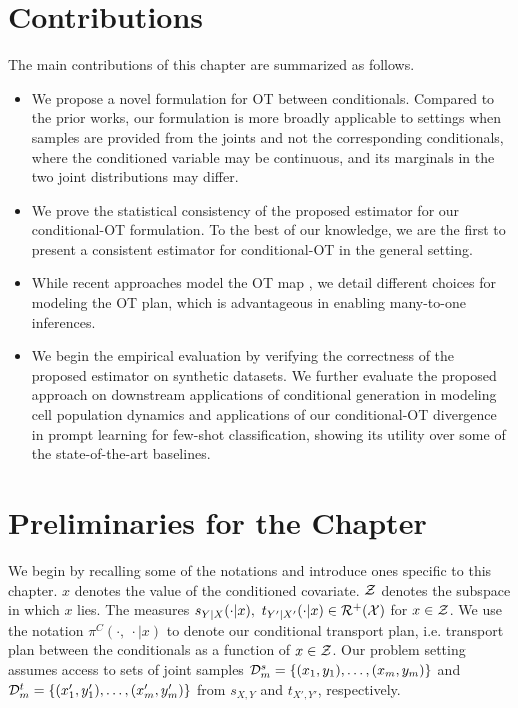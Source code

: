 \section{Contributions}
The main contributions of this chapter are summarized as follows.
\begin{itemize}
\item We propose a novel formulation for OT between conditionals. Compared to the prior works, our formulation is more broadly applicable to settings when samples are provided from the joints and not the corresponding conditionals, where the conditioned variable may be continuous, and its marginals in the two joint distributions may differ.
\item We prove the statistical consistency of the proposed estimator for our conditional-OT formulation. To the best of our knowledge, we are the first to present a consistent estimator for conditional-OT in the general setting.
\item While recent approaches model the OT map \citep{Tabak21,Cuturi22}, we detail different choices for modeling the OT plan, which is advantageous in enabling many-to-one inferences.
\item We begin the empirical evaluation by verifying the correctness of the proposed estimator on synthetic datasets. We further evaluate the proposed approach on downstream applications of conditional generation in modeling cell population dynamics and applications of our conditional-OT divergence in prompt learning for few-shot classification, showing its utility over some of the state-of-the-art baselines.
\end{itemize}

\section{Preliminaries for the Chapter}
We begin by recalling some of the notations and introduce ones specific to this chapter. $x$ denotes the value of the conditioned covariate. $\mathcal{Z}$ denotes the subspace in which $x$ lies. The measures $s_{Y|X}(\cdot|x),\ t_{Y'|X'}(\cdot|x)\in \calR^+(\calX)$ for $x\in \mathcal{Z}$. We use the notation $\pi^C(\cdot, \ \cdot|x)$ to denote our conditional transport plan, i.e. transport plan between the conditionals as a function of $x\in \mathcal{Z}$.
Our problem setting assumes access to sets of joint samples $\mathcal{D}_m^s = \{(x_1,y_1),\ldots,(x_m,y_m)\}$ and $\mathcal{D}_m^t=\{(x'_1,y'_1),\ldots,(x'_m,y'_m)\}$ from $s_{X, Y}$ and $t_{X', Y'}$, respectively.


